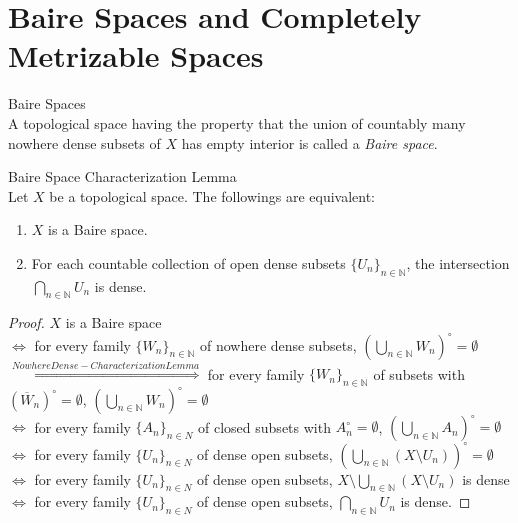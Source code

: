 \section{Baire Spaces and Completely Metrizable Spaces}

\begin{definition}{Baire Spaces}\\
A topological space having the property that the union of countably many nowhere dense subsets of $X$ has empty interior is called a \textit{Baire space}.
\end{definition}

\begin{lemma}{Baire Space Characterization Lemma}\\
Let $X$ be a topological space. The followings are equivalent:
\begin{enumerate}
    \item $X$ is a Baire space.
    \item For each countable collection of open dense subsets $\{ U_n \}_{n \in \mathbb{N}}$, the intersection $\bigcap_{n \in \mathbb{N}} U_n$ is dense.
\end{enumerate}
\end{lemma}

\begin{proof}
    $X$ is a Baire space\\
    $\Leftrightarrow$ for every family $\{W_n\}_{n \in \mathbb{N}}$ of nowhere dense subsets, $(\bigcup_{n \in \mathbb{N}} W_n)^\circ =\emptyset$\\
    $\overset{Nowhere Dense-Characterization Lemma}{\Leftrightarrow}$ for every family $\{W_n\}_{n \in \mathbb{N}}$ of subsets with $(\overline{W}_n)^\circ =\emptyset$, $(\bigcup_{n \in \mathbb{N}} W_n)^\circ =\emptyset$\\
    $\Leftrightarrow$ for every family $\{A_n \}_{n \in N}$ of closed subsets with $A_n ^\circ =\emptyset$, $(\bigcup_{n \in \mathbb{N}} A_n)^\circ =\emptyset$\\
    $\Leftrightarrow$ for every family $\{U_n \}_{n \in N}$ of dense open subsets, $(\bigcup_{n \in \mathbb{N}} (X \setminus U_n))^\circ =\emptyset$\\
    $\Leftrightarrow$ for every family $\{U_n \}_{n \in N}$ of dense open subsets, $X \setminus \bigcup_{n \in \mathbb{N}} (X \setminus U_n)$ is dense\\
    $\Leftrightarrow$ for every family $\{U_n \}_{n \in N}$ of dense open subsets, $\bigcap_{n \in \mathbb{N}} U_n$ is dense.
\end{proof}

